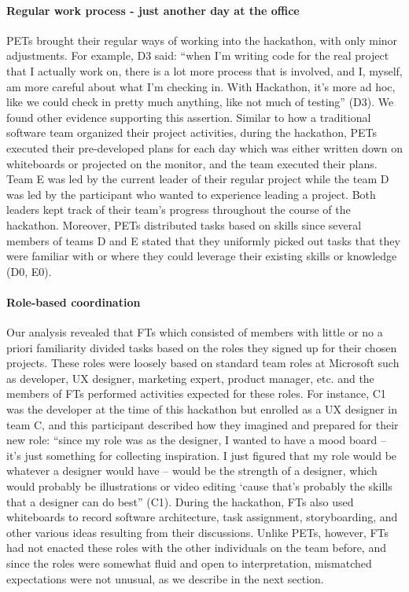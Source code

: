 \documentclass{hcij}
\begin{document}
\paragraph{Regular work process - just another day at the office}
PETs brought their regular ways of working into the hackathon, with only minor adjustments. For example, D3 said: “when I'm writing code for the real project that I actually work on, there is a lot more process that is involved, and I, myself, am more careful about what I'm checking in. With Hackathon, it's more ad hoc, like we could check in pretty much anything, like not much of testing” (D3). We found other evidence supporting this assertion. Similar to how a traditional software team organized their project activities, during the hackathon, PETs executed their pre-developed plans for each day which was either written down on whiteboards or projected on the monitor, and the team executed their plans. Team E was led by the current leader of their regular project while the team D was led by the participant who wanted to experience leading a project. Both leaders kept track of their team’s progress throughout the course of the hackathon. Moreover, PETs distributed tasks based on skills since several members of teams D and E stated that they uniformly picked out tasks that they were familiar with or where they could leverage their existing skills or knowledge (D0, E0).

\paragraph{Role-based coordination}
Our analysis revealed that FTs which consisted of members with little or no a priori familiarity divided tasks based on the roles they signed up for their chosen projects. These roles were loosely based on standard team roles at Microsoft such as developer, UX designer, marketing expert, product manager, etc. and the members of FTs performed activities expected for these roles. For instance, C1 was the developer at the time of this hackathon but enrolled as a UX designer in team C, and this participant described how they imagined and prepared for their new role: “since my role was as the designer, I wanted to have a mood board – it’s just something for collecting inspiration. I just figured that my role would be whatever a designer would have – would be the strength of a designer, which would probably be illustrations or video editing ‘cause that’s probably the skills that a designer can do best” (C1).
During the hackathon, FTs also used whiteboards to record software architecture, task assignment, storyboarding, and other various ideas resulting from their discussions. Unlike PETs, however, FTs had not enacted these roles with the other individuals on the team before, and since the roles were somewhat fluid and open to interpretation, mismatched expectations were not unusual, as we describe in the next section.
\end{document}
